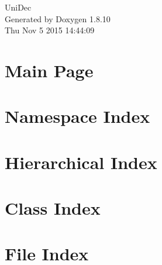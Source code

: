 \documentclass[twoside]{book}
\newcommand{\+}{\discretionary{\mbox{\scriptsize$\hookleftarrow$}}{}{}}
\newcommand{\clearemptydoublepage}{%
  \newpage{\pagestyle{empty}\cleardoublepage}%
}
\begin{document}
\hypersetup{pageanchor=false,
             bookmarks=true,
             bookmarksnumbered=true,
             pdfencoding=unicode
            }
\begin{titlepage}
\vspace*{7cm}
\begin{center}%
{\Large Uni\+Dec }\\
\vspace*{1cm}
{\large Generated by Doxygen 1.8.10}\\
\vspace*{0.5cm}
{\small Thu Nov 5 2015 14:44:09}\\
\end{center}
\end{titlepage}
\clearemptydoublepage
\tableofcontents
\clearemptydoublepage
{}
\hypersetup{pageanchor=true}

\chapter{Main Page}
\label{index}\hypertarget{index}{}
\chapter{Namespace Index}

\chapter{Hierarchical Index}

\chapter{Class Index}

\chapter{File Index}

\end{document}

